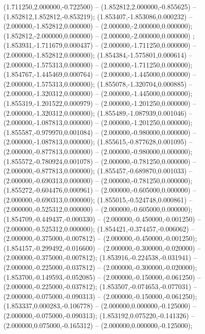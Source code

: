  (1.711250,2.000000,-0.722500) -- (1.852812,2.000000,-0.855625) -- (1.852812,1.852812,-0.853219);
 (1.853407,-1.853086,0.000232) -- (2.000000,-1.852812,0.000000) -- (2.000000,-2.000000,0.000000);
 (1.852812,-2.000000,0.000000) -- (2.000000,-2.000000,0.000000) ;
 (1.853931,-1.711679,0.000437) -- (2.000000,-1.711250,0.000000) -- (2.000000,-1.852812,0.000000);
 (1.854384,-1.575801,0.000614) -- (2.000000,-1.575313,0.000000) -- (2.000000,-1.711250,0.000000);
 (1.854767,-1.445469,0.000764) -- (2.000000,-1.445000,0.000000) -- (2.000000,-1.575313,0.000000);
 (1.855078,-1.320704,0.000885) -- (2.000000,-1.320312,0.000000) -- (2.000000,-1.445000,0.000000);
 (1.855319,-1.201522,0.000979) -- (2.000000,-1.201250,0.000000) -- (2.000000,-1.320312,0.000000);
 (1.855489,-1.087939,0.001046) -- (2.000000,-1.087813,0.000000) -- (2.000000,-1.201250,0.000000);
 (1.855587,-0.979970,0.001084) -- (2.000000,-0.980000,0.000000) -- (2.000000,-1.087813,0.000000);
 (1.855615,-0.877628,0.001095) -- (2.000000,-0.877813,0.000000) -- (2.000000,-0.980000,0.000000);
 (1.855572,-0.780924,0.001078) -- (2.000000,-0.781250,0.000000) -- (2.000000,-0.877813,0.000000);
 (1.855457,-0.689870,0.001033) -- (2.000000,-0.690313,0.000000) -- (2.000000,-0.781250,0.000000);
 (1.855272,-0.604476,0.000961) -- (2.000000,-0.605000,0.000000) -- (2.000000,-0.690313,0.000000);
 (1.855015,-0.524748,0.000861) -- (2.000000,-0.525312,0.000000) -- (2.000000,-0.605000,0.000000);
 (1.854709,-0.449437,-0.000330) -- (2.000000,-0.450000,-0.001250) -- (2.000000,-0.525312,0.000000);
 (1.854421,-0.374457,-0.006062) -- (2.000000,-0.375000,-0.007812) -- (2.000000,-0.450000,-0.001250);
 (1.854157,-0.299492,-0.016600) -- (2.000000,-0.300000,-0.020000) -- (2.000000,-0.375000,-0.007812);
 (1.853916,-0.224538,-0.031941) -- (2.000000,-0.225000,-0.037812) -- (2.000000,-0.300000,-0.020000);
 (1.853700,-0.149593,-0.052085) -- (2.000000,-0.150000,-0.061250) -- (2.000000,-0.225000,-0.037812);
 (1.853507,-0.074653,-0.077031) -- (2.000000,-0.075000,-0.090313) -- (2.000000,-0.150000,-0.061250);
 (1.853337,0.000283,-0.106778) -- (2.000000,0.000000,-0.125000) -- (2.000000,-0.075000,-0.090313);
 (1.853192,0.075220,-0.141326) -- (2.000000,0.075000,-0.165312) -- (2.000000,0.000000,-0.125000);
